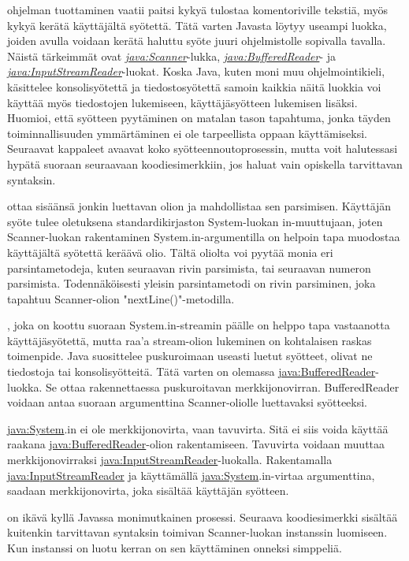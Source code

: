 \documentclass{tufte-book}
\newcommand{\java}[1]{\underline{\gls{java:#1}}}
\newcommand{\newjava}[1]{\textit{\java{#1}}}
\begin{document}
 ohjelman tuottaminen vaatii paitsi kykyä tulostaa
komentoriville tekstiä, myös kykyä kerätä käyttäjältä syötettä. Tätä varten Javasta löytyy
useampi luokka, joiden avulla voidaan kerätä haluttu syöte juuri ohjelmistolle sopivalla tavalla.
Näistä tärkeimmät ovat \newjava{Scanner}-lukka, \newjava{BufferedReader}- ja
\newjava{InputStreamReader}-luokat. Koska Java, kuten moni muu ohjelmointikieli, käsittelee
konsolisyötettä ja tiedostosyötettä samoin kaikkia näitä luokkia voi käyttää myös tiedostojen
lukemiseen, käyttäjäsyötteen lukemisen lisäksi. Huomioi, että syötteen pyytäminen on matalan
tason tapahtuma, jonka täyden toiminnallisuuden ymmärtäminen ei ole tarpeellista oppaan
käyttämiseksi. Seuraavat kappaleet avaavat koko syötteennoutoprosessin, mutta voit halutessasi
hypätä suoraan seuraavaan koodiesimerkkiin, jos haluat vain opiskella tarvittavan syntaksin.

\newthought{\java{Scanner}-luokka} ottaa sisäänsä jonkin luettavan olion ja mahdollistaa sen
parsimisen. Käyttäjän syöte tulee oletuksena standardikirjaston System-luokan in-muuttujaan,
joten Scanner-luokan rakentaminen System.in-argumentilla on helpoin tapa muodostaa käyttäjältä
syötettä keräävä olio. Tältä oliolta voi pyytää monia eri parsintametodeja, kuten seuraavan rivin
parsimista, tai seuraavan numeron parsimista. Todennäköisesti yleisin parsintametodi on rivin
parsiminen, joka tapahtuu Scanner-olion "nextLine()"-metodilla.

\newthought{\java{Scanner}}, joka on koottu suoraan System.in-streamin
päälle on helppo tapa vastaanotta käyttäjäsyötettä, mutta raa'a stream-olion lukeminen on
kohtalaisen raskas toimenpide. Java suosittelee puskuroimaan useasti luetut syötteet, olivat ne
tiedostoja tai konsolisyötteitä. Tätä varten on olemassa \java{BufferedReader}-luokka. Se ottaa
rakennettaessa puskuroitavan merkkijonovirran. BufferedReader voidaan antaa suoraan argumenttina
Scanner-oliolle luettavaksi syötteeksi.

 \java{System}.in ei ole merkkijonovirta, vaan tavuvirta. Sitä ei siis
voida käyttää raakana \java{BufferedReader}-olion rakentamiseen. Tavuvirta voidaan muuttaa
merkkijonovirraksi \java{InputStreamReader}-luokalla. Rakentamalla \java{InputStreamReader}
ja käyttämällä \java{System}.in-virtaa argumenttina, saadaan merkkijonovirta, joka sisältää
käyttäjän syötteen.

 on ikävä kyllä Javassa monimutkainen prosessi. Seuraava
koodiesimerkki sisältää kuitenkin tarvittavan syntaksin toimivan Scanner-luokan instanssin
luomiseen. Kun instanssi on luotu kerran on sen käyttäminen onneksi simppeliä.
\end{document}
